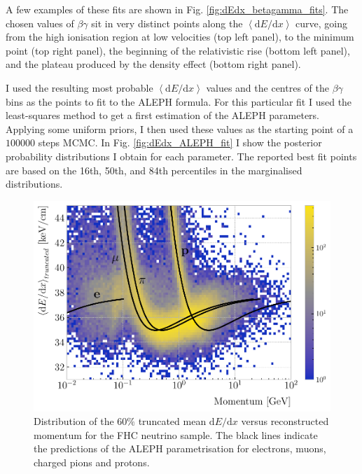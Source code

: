 A few examples of these fits are shown in Fig. \ref{fig:dEdx_betagamma_fits}. The chosen values of $\beta\gamma$ sit in very distinct points along the $\left<\mathrm{d}E/\mathrm{d}x\right>$ curve, going from the high ionisation region at low velocities (top left panel), to the minimum point (top right panel), the beginning of the relativistic rise (bottom left panel), and the plateau produced by the density effect (bottom right panel).

I used the resulting most probable $\left<\mathrm{d}E/\mathrm{d}x\right>$ values and the centres of the $\beta\gamma$ bins as the points to fit to the ALEPH formula. For this particular fit I used the least-squares method to get a first estimation of the ALEPH parameters. Applying some uniform priors, I then used these values as the starting point of a $100000$ steps MCMC. In Fig. \ref{fig:dEdx_ALEPH_fit} I show the posterior probability distributions I obtain for each parameter. The reported best fit points are based on the 16th, 50th, and 84th percentiles in the marginalised distributions.

\begin{figure}[t]
	\centering
	\includegraphics[width=.90\linewidth]{Images/GArSoft_PID/dEdx/dEdx_curves_with_fit.pdf}
	\caption[Distribution of the $60\%$ truncated mean $\mathrm{d}E/\mathrm{d}x$ versus reconstructed momentum for the FHC neutrino sample.]{Distribution of the $60\%$ truncated mean $\mathrm{d}E/\mathrm{d}x$ versus reconstructed momentum for the FHC neutrino sample. The black lines indicate the predictions of the ALEPH parametrisation for electrons, muons, charged pions and protons.}
	\label{fig:dEdx_vs_momentum}
\end{figure}

